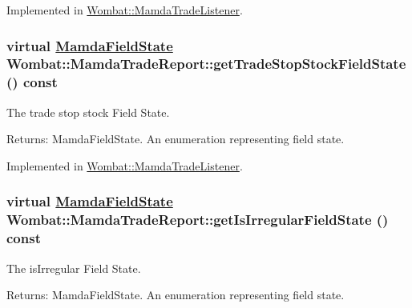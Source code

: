 Implemented in \hyperlink{classWombat_1_1MamdaTradeListener_2090b9605a4191bf78b5cef58c7e1fbe}{Wombat::Mamda\-Trade\-Listener}.\hypertarget{classWombat_1_1MamdaTradeReport_cca5c5f38da9a0a129b2c8b386ead49b}{
\subsubsection[getTradeStopStockFieldState]{\setlength{\rightskip}{0pt plus 5cm}virtual \hyperlink{namespaceWombat_93aac974f2ab713554fd12a1fa3b7d2a}{Mamda\-Field\-State} Wombat::Mamda\-Trade\-Report::get\-Trade\-Stop\-Stock\-Field\-State () const}}
\label{classWombat_1_1MamdaTradeReport_cca5c5f38da9a0a129b2c8b386ead49b}


The trade stop stock Field State. 

\begin{Desc}
\item[Returns:]Mamda\-Field\-State. An enumeration representing field state. \end{Desc}


Implemented in \hyperlink{classWombat_1_1MamdaTradeListener_ba6a73453e3956f883f40b5ae7d127d0}{Wombat::Mamda\-Trade\-Listener}.\hypertarget{classWombat_1_1MamdaTradeReport_69578220fbe3f7892865d86384d35b4b}{
\subsubsection[getIsIrregularFieldState]{\setlength{\rightskip}{0pt plus 5cm}virtual \hyperlink{namespaceWombat_93aac974f2ab713554fd12a1fa3b7d2a}{Mamda\-Field\-State} Wombat::Mamda\-Trade\-Report::get\-Is\-Irregular\-Field\-State () const}}
\label{classWombat_1_1MamdaTradeReport_69578220fbe3f7892865d86384d35b4b}


The is\-Irregular Field State. 

\begin{Desc}
\item[Returns:]Mamda\-Field\-State. An enumeration representing field state. \end{Desc}



